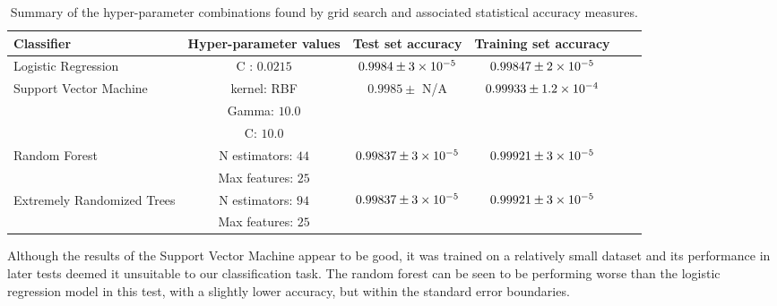 \begin{table}
    \centering
    \tiny
    \begin{tabular}{p{} c c c c c}
        Classifier                                  & Hyper-parameter values    & Test set accuracy     & Training set accuracy          \\
        \hline
        Logistic Regression                         & C : $0.0215$              & $0.9984 \pm 3\times 10^{-5}$  & $0.99847 \pm 2\times 10^{-5}$ \\
        \multirow{3}{*}{\parbox{0.2\textwidth}{Support Vector Machine}}     & kernel: RBF               & \multirow{3}{*}{$0.9985 \pm$ N/A}    & \multirow{3}{*}{$0.99933 \pm 1.2\times 10^{-4}$} \\
                                                    & Gamma: $10.0$             &                           &                               &                               &       \\
                                                    & C: $10.0$                 &                           &                               &                               &       \\
        \multirow{2}{*}{\parbox{0.2\textwidth}{Random Forest}}              & N estimators: $44$        & \multirow{2}{*}{$0.99837 \pm 3\times 10^{-5}$} & \multirow{2}{*}{$0.99921 \pm 3\times 10^{-5}$} \\
                                                    & Max features: $25$        &                           &                               &                               &       \\
        \multirow{2}{*}{\parbox{0.2\textwidth}{Extremely Randomized Trees}} & N estimators: $94$        & \multirow{2}{*}{$0.99837 \pm 3\times 10^{-5}$} & \multirow{2}{*}{$0.99921 \pm 3\times 10^{-5}$} \\
                                                    & Max features: $25$        &                           &                               &                               &       \\
    \end{tabular}
    \caption{Summary of the hyper-parameter combinations found by grid search and associated statistical accuracy measures.}
    \label{tab:gridresults}
\end{table}

Although the results of the Support Vector Machine appear to be good, it was trained on a relatively small dataset and its performance in later tests deemed it unsuitable to our classification task.
The random forest can be seen to be performing worse than the logistic regression model in this test, with a slightly lower accuracy, but within the standard error boundaries.

